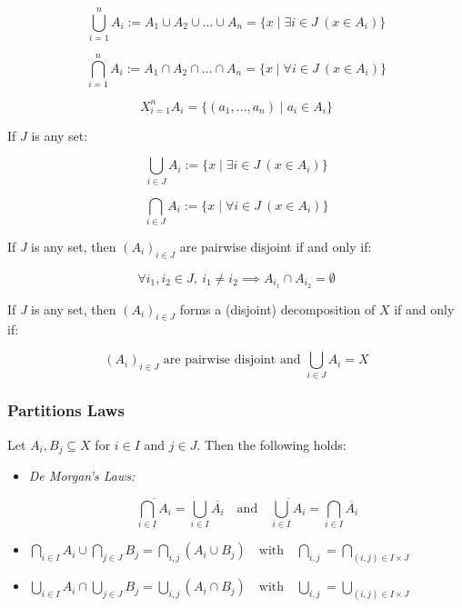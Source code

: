 \[
	\bigcup_{i=1}^{n} A_i := A_1 \cup A_2 \cup \dots \cup A_n = \{ x \mid \exists i \in J \ (x \in A_i) \}
\]

\[
	\bigcap_{i=1}^{n} A_i := A_1 \cap A_2 \cap \dots \cap A_n = \{ x \mid \forall i \in J \ (x \in A_i) \}
\]

\[
	X_{i=1}^{n} A_i = \{(a_1, \dots, a_n) \mid a_i \in A_i \}
\]

If \( J \) is any set:

\[
	\bigcup_{i \in J} A_i := \{ x \mid \exists i \in J \ (x \in A_i) \}
\]

\[
	\bigcap_{i \in J} A_i := \{ x \mid \forall i \in J \ (x \in A_i) \}
\]

If \emph{J} is any set, then \( {(A_i)}_{i \in J} \) are pairwise disjoint if and only if:

\[
	\forall i_1, i_2 \in J, \ i_1 \neq i_2 \implies A_{i_1} \cap A_{i_2} = \emptyset
\]

If \emph{J} is any set, then \( {(A_i)}_{i \in J} \) forms a (disjoint) decomposition of \(X\) if 
and only if:

\[
	{(A_i)}_{i \in J} \text{ are pairwise disjoint and } \bigcup_{i \in J} A_i = X
\]

\subsubsection{Partitions Laws}

Let \( A_i, B_j \subseteq X \) for \( i \in I \) and \( j \in J \). Then the following holds:

\begin{itemize}

	\item\emph{De Morgan's Laws:}

	\[
		\overline{\bigcap_{i \in I} A_i}= \bigcup_{i \in I} \overline{A_i} \quad \text{and} \quad 
		\overline{\bigcup_{i \in I} A_i} = \bigcap_{i \in I} \overline{A_i}
	\]

	\item\(
		\bigcap_{i \in I} A_i \cup \bigcap_{j \in J} B_j = \bigcap_{i,j} (A_i \cup B_j) \quad \text{with} 
		\quad \bigcap_{i,j} = \bigcap_{(i,j) \in I \times J}
	\)


	\item\(
		\bigcup_{i \in I} A_i \cap \bigcup_{j \in J} B_j = \bigcup_{i,j} (A_i \cap B_j) \quad \text{with} 
		\quad \bigcup_{i,j} = \bigcup_{(i,j) \in I \times J}
	\)

\end{itemize}

